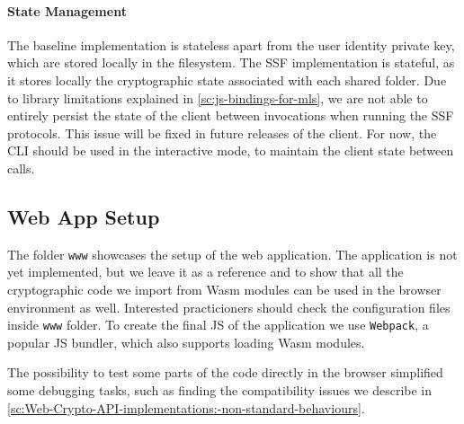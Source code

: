 \paragraph{State Management}
The baseline implementation is stateless apart
from the user identity private key, which are
stored locally in the filesystem.
The SSF implementation is stateful,
as it stores locally the cryptographic state
associated with each shared folder.
Due to library limitations explained in \cref{sc:js-bindings-for-mls}, 
we are not able to entirely persist the state of the client between invocations
when running the SSF protocols. This issue will be
fixed in future releases of the client.
For now, the CLI should be used in the interactive mode,
to maintain the client state between calls.

\subsection{Web App Setup}
The folder \texttt{www} showcases the setup
of the web application. The application is not
yet implemented, but we leave it as a reference
and to show that all the cryptographic code
we import from Wasm modules can be used
in the browser environment as well.
Interested practicioners should check
the configuration files inside \texttt{www} folder.
To create the final JS of the application
we use \texttt{Webpack}, a popular JS bundler,
which also supports loading Wasm modules.

The possibility to test some parts of the
code directly in the browser simplified some
debugging tasks, 
such as finding the compatibility issues
we describe in \cref{sc:Web-Crypto-API-implementations:-non-standard-behaviours}.